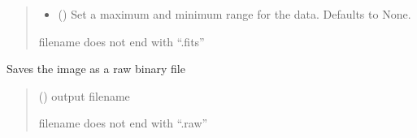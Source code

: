 \documentclass[letterpaper,10pt,english]{sphinxmanual}
\begin{document}
\begin{fulllineitems}
\begin{fulllineitems}
\begin{quote}
\begin{description}
\begin{itemize}
\item {} 
\sphinxAtStartPar
{} (\sphinxstyleliteralemphasis{\sphinxupquote{{[}}}\sphinxstyleliteralemphasis{\sphinxupquote{, }}\sphinxstyleliteralemphasis{\sphinxupquote{{]}}}\sphinxstyleliteralemphasis{\sphinxupquote{, }}) \textendash{} Set a maximum and minimum range for the data. Defaults to None.

\end{itemize}

\sphinxAtStartPar
{} \textendash{} filename does not end with “.fits”

\end{description}\end{quote}

\end{fulllineitems}


\begin{fulllineitems}
\label{\detokenize{micropolarray:micropolarray.image.Image.save_as_raw}}
\pysigstartsignatures
{}
\pysigstopsignatures
\sphinxAtStartPar
Saves the image as a raw binary file
\begin{quote}\begin{description}
\sphinxAtStartPar
{} () \textendash{} output filename

\sphinxAtStartPar
{} \textendash{} filename does not end with “.raw”

\end{description}\end{quote}

\end{fulllineitems}



\end{fulllineitems}
\end{document}
